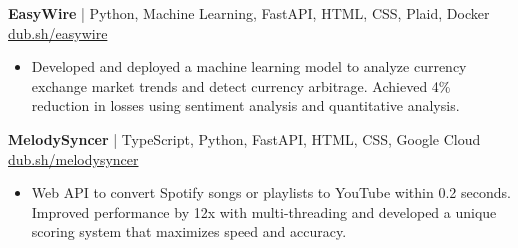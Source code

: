 \documentclass[11pt]{article}       %
\begin{document}
\textbf{EasyWire} | Python, Machine Learning, FastAPI, HTML, CSS, Plaid, Docker \hfill \href{https://dub.sh/easywire}{\color{blue} dub.sh/easywire} \\
\vspace{-6pt}
\begin{itemize}
  \item Developed and deployed a machine learning model to analyze currency exchange market trends and detect currency arbitrage. Achieved 4\% reduction in losses using sentiment analysis and quantitative analysis.
\end{itemize}

\textbf{MelodySyncer} | TypeScript, Python, FastAPI, HTML, CSS, Google Cloud \hfill \href{https://dub.sh/melodysyncer}{\color{blue} dub.sh/melodysyncer} \\
\vspace{-6pt}
\begin{itemize}
  \item Web API to convert Spotify songs or playlists to YouTube within 0.2 seconds. Improved performance by 12x with multi-threading and developed a unique scoring system that maximizes speed and accuracy.
\end{itemize}


\end{document}
